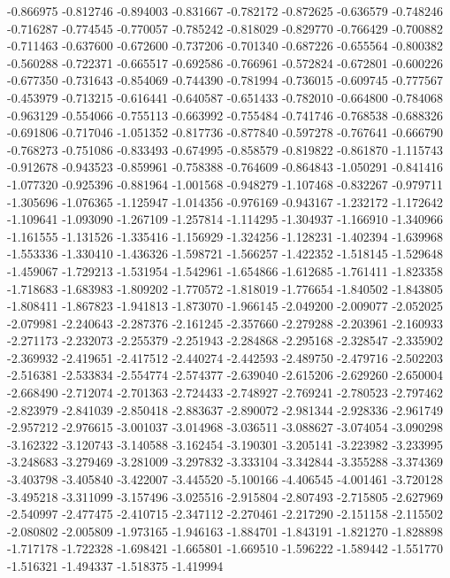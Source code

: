 -0.866975
-0.812746
-0.894003
-0.831667
-0.782172
-0.872625
-0.636579
-0.748246
-0.716287
-0.774545
-0.770057
-0.785242
-0.818029
-0.829770
-0.766429
-0.700882
-0.711463
-0.637600
-0.672600
-0.737206
-0.701340
-0.687226
-0.655564
-0.800382
-0.560288
-0.722371
-0.665517
-0.692586
-0.766961
-0.572824
-0.672801
-0.600226
-0.677350
-0.731643
-0.854069
-0.744390
-0.781994
-0.736015
-0.609745
-0.777567
-0.453979
-0.713215
-0.616441
-0.640587
-0.651433
-0.782010
-0.664800
-0.784068
-0.963129
-0.554066
-0.755113
-0.663992
-0.755484
-0.741746
-0.768538
-0.688326
-0.691806
-0.717046
-1.051352
-0.817736
-0.877840
-0.597278
-0.767641
-0.666790
-0.768273
-0.751086
-0.833493
-0.674995
-0.858579
-0.819822
-0.861870
-1.115743
-0.912678
-0.943523
-0.859961
-0.758388
-0.764609
-0.864843
-1.050291
-0.841416
-1.077320
-0.925396
-0.881964
-1.001568
-0.948279
-1.107468
-0.832267
-0.979711
-1.305696
-1.076365
-1.125947
-1.014356
-0.976169
-0.943167
-1.232172
-1.172642
-1.109641
-1.093090
-1.267109
-1.257814
-1.114295
-1.304937
-1.166910
-1.340966
-1.161555
-1.131526
-1.335416
-1.156929
-1.324256
-1.128231
-1.402394
-1.639968
-1.553336
-1.330410
-1.436326
-1.598721
-1.566257
-1.422352
-1.518145
-1.529648
-1.459067
-1.729213
-1.531954
-1.542961
-1.654866
-1.612685
-1.761411
-1.823358
-1.718683
-1.683983
-1.809202
-1.770572
-1.818019
-1.776654
-1.840502
-1.843805
-1.808411
-1.867823
-1.941813
-1.873070
-1.966145
-2.049200
-2.009077
-2.052025
-2.079981
-2.240643
-2.287376
-2.161245
-2.357660
-2.279288
-2.203961
-2.160933
-2.271173
-2.232073
-2.255379
-2.251943
-2.284868
-2.295168
-2.328547
-2.335902
-2.369932
-2.419651
-2.417512
-2.440274
-2.442593
-2.489750
-2.479716
-2.502203
-2.516381
-2.533834
-2.554774
-2.574377
-2.639040
-2.615206
-2.629260
-2.650004
-2.668490
-2.712074
-2.701363
-2.724433
-2.748927
-2.769241
-2.780523
-2.797462
-2.823979
-2.841039
-2.850418
-2.883637
-2.890072
-2.981344
-2.928336
-2.961749
-2.957212
-2.976615
-3.001037
-3.014968
-3.036511
-3.088627
-3.074054
-3.090298
-3.162322
-3.120743
-3.140588
-3.162454
-3.190301
-3.205141
-3.223982
-3.233995
-3.248683
-3.279469
-3.281009
-3.297832
-3.333104
-3.342844
-3.355288
-3.374369
-3.403798
-3.405840
-3.422007
-3.445520
-5.100166
-4.406545
-4.001461
-3.720128
-3.495218
-3.311099
-3.157496
-3.025516
-2.915804
-2.807493
-2.715805
-2.627969
-2.540997
-2.477475
-2.410715
-2.347112
-2.270461
-2.217290
-2.151158
-2.115502
-2.080802
-2.005809
-1.973165
-1.946163
-1.884701
-1.843191
-1.821270
-1.828898
-1.717178
-1.722328
-1.698421
-1.665801
-1.669510
-1.596222
-1.589442
-1.551770
-1.516321
-1.494337
-1.518375
-1.419994
